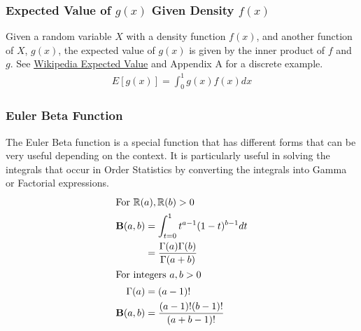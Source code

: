 \subsubsection{Expected Value of \texorpdfstring{$g(x)$}{g(x)} Given Density \texorpdfstring{$f(x)$}{f(x)}}
Given a random variable $X$ with a density function $f(x)$, and another 
function of $X$, $g(x)$, 
the expected value of $g(x)$ is given by the inner product of $f$ and $g$. 
See \href{https://en.wikipedia.org/wiki/Expected_value}
{Wikipedia Expected Value} and Appendix A for a discrete example.
\begin{align}
E[g(x)] = \int_0^1 g(x)f(x)dx \label{EV}
\end{align}
\subsubsection{Euler Beta Function}
The Euler Beta function is a special function that has different forms 
that can be very useful depending on the context.
It is particularly useful in solving the integrals that occur in Order 
Statistics by converting the integrals into Gamma or Factorial expressions.
\begin{align}
\shortintertext{For $\mathbb{R}(a), \mathbb{R}(b) > 0$}
\boldsymbol{\mathrm{B}}(a,b)    &= \int_{t=0}^1 t^{a-1} (1-t)^{b-1}dt \label{betaIntegral} \\
          &= \frac {\Gamma(a)\Gamma(b)}{\Gamma(a+b)} \notag\\
\shortintertext{For integers $a, b > 0$}
\Gamma(a) &= (a-1)! \notag \\
\boldsymbol{\mathrm{B}}(a,b)    &= \frac{(a-1)!(b-1)!}{(a+b-1)!} \label{betaFactorial}
\end{align}
%
%

